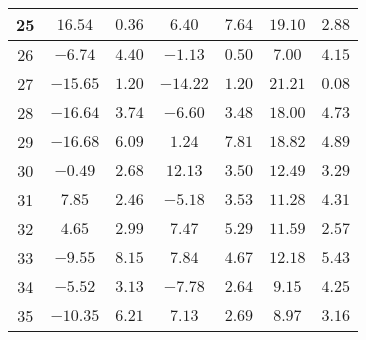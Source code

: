 \begin{table}[H]
\begin{tabular}{|c|c|c|c|c|c|c|}
                        25  &   $16.54$  &  $0.36$   &  $6.40$    &  $7.64$   &  $19.10$  & $2.88$  \\ \hline
                        26  &   $-6.74$  &  $4.40$   &  $-1.13$   &  $0.50$   &  $7.00$   & $4.15$  \\ \hline
                        27  &   $-15.65$ &  $1.20$   &  $-14.22$  &  $1.20$   &  $21.21$  & $0.08$  \\ \hline
                        28  &   $-16.64$ &  $3.74$   &  $-6.60$   &  $3.48$   &  $18.00$  & $4.73$  \\ \hline
                        29  &   $-16.68$ &  $6.09$   &  $1.24$    &  $7.81$   &  $18.82$  & $4.89$  \\ \hline
                        30  &   $-0.49$  &  $2.68$   &  $12.13$   &  $3.50$   &  $12.49$  & $3.29$  \\ \hline
                        31  &   $7.85$   &  $2.46$   &  $-5.18$   &  $3.53$   &  $11.28$  & $4.31$  \\ \hline
                        32  &   $4.65$   &  $2.99$   &  $7.47$    &  $5.29$   &  $11.59$  & $2.57$  \\ \hline
                        33  &   $-9.55$  &  $8.15$   &  $7.84$    &  $4.67$   &  $12.18$  & $5.43$  \\ \hline
                        34  &   $-5.52$  &  $3.13$   &  $-7.78$   &  $2.64$   &  $9.15$   & $4.25$  \\ \hline
                        35  &   $-10.35$ &  $6.21$   &  $7.13$    &  $2.69$   &  $8.97$   & $3.16$  \\ \hline
        \end{tabular}
    \label{tab:media_lab_4_espiral}    
\end{table}

\newpage
